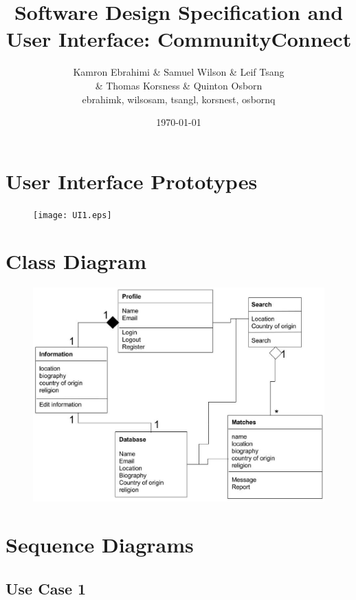 \documentclass[12pt]{articlei}
\title{Software Design Specification and User Interface: CommunityConnect}
\author{Kamron Ebrahimi \& Samuel Wilson \& Leif Tsang \\ \& Thomas Korsness  \& Quinton Osborn \\ ebrahimk, wilsosam, tsangl, korsnest, osbornq}
\date{\today}
\begin{document}
\maketitle

\tableofcontents

\newpage
\section{\bf User Interface Prototypes}

        \begin{figure}[h]
                \texttt{[image: UI1.eps]}
        \end{figure}



\newpage
\section{\bf Class Diagram}
      \begin{figure}[h]
              \includegraphics[width =\linewidth]{cc_class_diagram.eps}
      \end{figure}


\newpage
\section{\bf Sequence Diagrams}
  \subsection{\bf Use Case 1}
\end{document}
